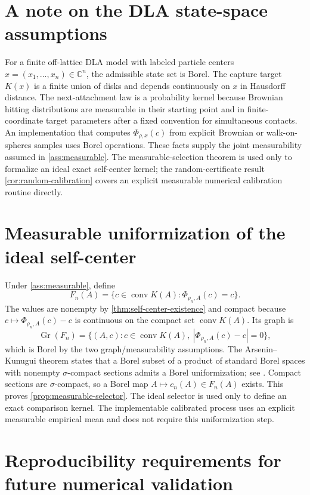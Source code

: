 \documentclass[11pt]{article}
\theoremstyle{mainthm}
\theoremstyle{definition}
\theoremstyle{remark}
\newcommand{\C}{\mathbb C}
\newcommand{\conv}{\operatorname{conv}}
\begin{document}
\section{A note on the DLA state-space assumptions}
\label{app:state-space}

For a finite off-lattice DLA model with labeled particle centers $x=(x_1,\ldots,x_n)\in\C^n$, the admissible state set is Borel. The capture target $K(x)$ is a finite union of disks and depends continuously on $x$ in Hausdorff distance. The next-attachment law is a probability kernel because Brownian hitting distributions are measurable in their starting point and in finite-coordinate target parameters after a fixed convention for simultaneous contacts. An implementation that computes $\Phi_{\rho,x}(c)$ from explicit Brownian or walk-on-spheres samples uses Borel operations. These facts supply the joint measurability assumed in \cref{ass:measurable}. The measurable-selection theorem is used only to formalize an ideal exact self-center kernel; the random-certificate result \cref{cor:random-calibration} covers an explicit measurable numerical calibration routine directly.

\section{Measurable uniformization of the ideal self-center}
\label{app:selector-proof}

Under \cref{ass:measurable}, define
\[
  F_n(A)=\{c\in\conv K(A):\Phi_{\rho_n,A}(c)=c\}.
\]
The values are nonempty by \cref{thm:self-center-existence} and compact because $c\mapsto\Phi_{\rho_n,A}(c)-c$ is continuous on the compact set $\conv K(A)$. Its graph is
\[
  \operatorname{Gr}(F_n)
  =\{(A,c):c\in\conv K(A),\ |\Phi_{\rho_n,A}(c)-c|=0\},
\]
which is Borel by the two graph/measurability assumptions. The Arsenin--Kunugui theorem states that a Borel subset of a product of standard Borel spaces with nonempty $\sigma$-compact sections admits a Borel uniformization; see \cite[Theorem~18.18]{Kechris1995}. Compact sections are $\sigma$-compact, so a Borel map $A\mapsto c_n(A)\in F_n(A)$ exists. This proves \cref{prop:measurable-selector}. The ideal selector is used only to define an exact comparison kernel. The implementable calibrated process uses an explicit measurable empirical mean and does not require this uniformization step.

\section{Reproducibility requirements for future numerical validation}
\label{app:validation-reproducibility}
\end{document}

